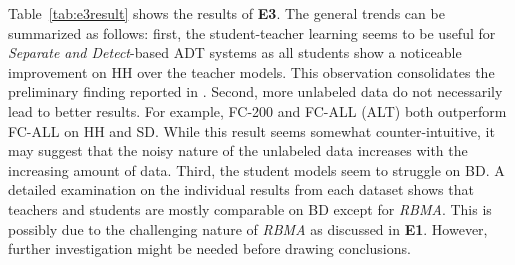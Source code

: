 \documentclass{article}
\newcommand{\comment}[1]{{\textcolor{blue}{#1}}}
\begin{document}
\begin{table}[]
\centering
{}
\caption{Evaluation results of the student-teacher-paradigm-based systems.}%
\label{tab:e3result}
\end{table}


Table~\ref{tab:e3result} shows the results of \textbf{E3}. The general trends can be summarized as follows: first, the student-teacher learning seems to be useful for \textit{Separate and Detect}-based ADT systems as all students show a noticeable improvement on HH over the teacher models. This observation consolidates the preliminary finding reported in \cite{Wu2017}. Second, more unlabeled data do not necessarily lead to better results. For example, FC-200 and FC-ALL (ALT) both outperform FC-ALL on HH and SD. While this result seems somewhat counter-intuitive, it may suggest that the noisy nature of the unlabeled data increases with the increasing amount of data. Third, the student models seem to struggle on BD. A detailed examination on the individual results from each dataset shows that teachers and students are mostly comparable on BD except for \textit{RBMA}. This is possibly due to the challenging nature of \textit{RBMA} as discussed in \textbf{E1}. However, further investigation might be needed before drawing conclusions. %
\end{document}
